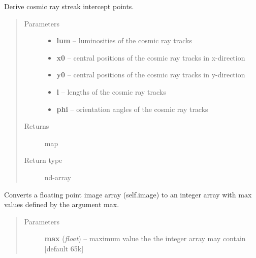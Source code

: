 \documentclass[a4paper,12pt,english]{sphinxmanual}
\begin{document}
\begin{fulllineitems}
\begin{fulllineitems}
\end{fulllineitems}


\begin{fulllineitems}
\label{simulator:simulator.simulator.VISsimulator.cosmicRayIntercepts}
Derive cosmic ray streak intercept points.
\begin{quote}\begin{description}
\item[{Parameters}] \leavevmode\begin{itemize}
\item {} 
\textbf{lum} -- luminosities of the cosmic ray tracks

\item {} 
\textbf{x0} -- central positions of the cosmic ray tracks in x-direction

\item {} 
\textbf{y0} -- central positions of the cosmic ray tracks in y-direction

\item {} 
\textbf{l} -- lengths of the cosmic ray tracks

\item {} 
\textbf{phi} -- orientation angles of the cosmic ray tracks

\end{itemize}

\item[{Returns}] \leavevmode
map

\item[{Return type}] \leavevmode
nd-array

\end{description}\end{quote}

\end{fulllineitems}


\begin{fulllineitems}
\label{simulator:simulator.simulator.VISsimulator.discretise}
Converts a floating point image array (self.image) to an integer array with max values
defined by the argument max.
\begin{quote}\begin{description}
\item[{Parameters}] \leavevmode
\textbf{max} (\emph{float}) -- maximum value the the integer array may contain {[}default 65k{]}


\end{description}
\end{quote}
\end{fulllineitems}
\end{fulllineitems}
\end{document}
